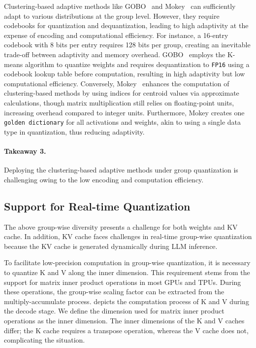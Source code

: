 Clustering-based adaptive methods like GOBO~\cite{zadeh2020gobo} and Mokey~\cite{zadeh2022mokey} can sufficiently adapt to various distributions at the group level. 
However, they require codebooks for quantization and dequantization, leading to high adaptivity at the expense of encoding and computational efficiency. 
For instance, a 16-entry codebook with 8 bits per entry requires 128 bits per group, creating an inevitable trade-off between adaptivity and memory overhead. GOBO~\cite{zadeh2020gobo} employs the K-means algorithm to quantize weights and requires dequantization to \texttt{FP16} using a codebook lookup table before computation, resulting in high adaptivity but low computational efficiency. 
Conversely, Mokey~\cite{zadeh2022mokey} enhances the computation of clustering-based methods by using indices for centroid values via approximate calculations, though matrix multiplication still relies on floating-point units, increasing overhead compared to integer units. 
Furthermore, Mokey creates one \texttt{golden dictionary} for all activations and weights, akin to using a single data type in quantization, thus reducing adaptivity.


\paragraph{Takeaway 3.} Deploying the clustering-based adaptive methods under group quantization is challenging owing to the low encoding and computation efficiency. 




\subsection{Support for Real-time Quantization}
\label{sec:moti_kvcache}

The above group-wise diversity presents a challenge for both weights and KV cache.
In addition, KV cache faces challenges in real-time group-wise quantization because the KV cache is generated dynamically during LLM inference.


To facilitate low-precision computation in group-wise quantization, it is necessary to quantize K and V along the inner dimension. 
This requirement stems from the support for matrix inner product operations in most GPUs and TPUs. 
During these operations, the group-wise scaling factor can be extracted from the multiply-accumulate process. 
 depicts the computation process of K and V during the decode stage. We define the dimension used for matrix inner product operations as the inner dimension. 
The inner dimensions of the K and V caches differ; the K cache requires a transpose operation, whereas the V cache does not, complicating the situation.


